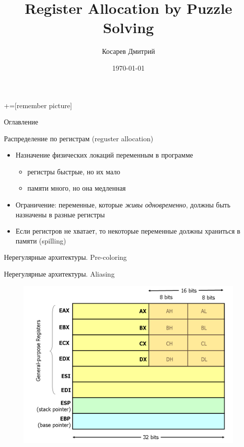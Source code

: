\documentclass[aspectratio=169
  , xcolor={svgnames}
  , hyperref={ colorlinks,citecolor=DeepPink4
             , linkcolor=DarkRed,urlcolor=DarkBlue}
  , russian
  ]{beamer}
\title[]{Register Allocation by Puzzle Solving}
\author{Косарев Дмитрий }
\institute{матмех СПбГУ}
\date{\today}
\theoremstyle{exerciseStyle1}
\begin{document}
\maketitle

+=[remember picture] 

\everymath{\displaystyle}

\begin{frame}{Оглавление}
  \tableofcontents
\end{frame}

\begin{frame}{Распределение по регистрам (reguster allocation)}
\begin{itemize}
  \item Назначение физических локаций переменным в программе
    \begin{itemize}
      \item регистры быстрые, но их мало
      \item памяти много, но она медленная
    \end{itemize}
  \item Ограничение: переменные, которые \emph{живы одновременно}, должны быть назначены в разные регистры
  \item Если регистров не хватает, то некоторые переменные должны храниться в памяти (spilling)
\end{itemize}
\end{frame}


\begin{frame}{Нерегулярные архитектуры. Pre-coloring}
\end{frame}


\begin{frame}[fragile]{Нерегулярные архитектуры. Aliasing}
\begin{figure}[h]
\includegraphics[scale=.35]{figures/x86-registers.png}
\end{figure}
\end{frame}
\end{document}
